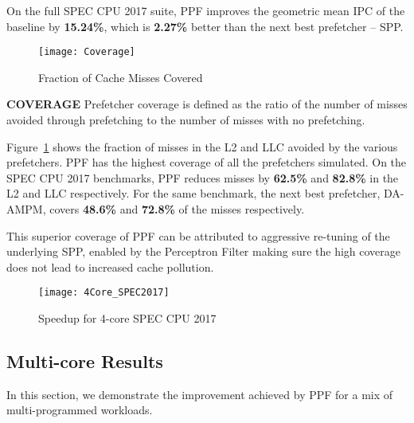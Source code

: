 On the full SPEC CPU 2017 suite, PPF improves the geometric mean IPC of 
the baseline by \textbf{15.24\%}, which is \textbf{2.27\%} better 
than the next best prefetcher -- SPP.
\newline

\begin{figure}[h]
\texttt{[image: Coverage]}
\caption{Fraction of Cache Misses Covered}
\label{Fig:Coverage}
\end{figure}


\noindent \textbf{COVERAGE}
\newline
Prefetcher coverage is defined as the ratio of the number of misses avoided
through prefetching to the number of misses with no prefetching.

Figure~\ref{Fig:Coverage} shows the fraction of misses in the L2 and LLC
avoided by the various prefetchers. PPF has the highest coverage of all the
prefetchers simulated. On the SPEC CPU 2017 benchmarks, PPF reduces misses by
\textbf{62.5\%} and \textbf{82.8\%} in the L2 and LLC respectively. For the
same benchmark, the next best prefetcher, DA-AMPM, covers \textbf{48.6\%} and
\textbf{72.8\%} of the misses respectively.

This superior coverage of PPF can be attributed to aggressive re-tuning of the
underlying SPP, enabled by the Perceptron Filter making sure the high coverage
does not lead to increased cache pollution.


\begin{figure}[ht]
\texttt{[image: 4Core\_SPEC2017]}
\caption{Speedup for 4-core SPEC CPU 2017}
\label{Fig:4Core_SPEC2017}
\end{figure}

\subsection{Multi-core Results}
\label{Results-Multi}
In this section, we demonstrate the improvement achieved by PPF for a mix of
multi-programmed workloads.
\newline

